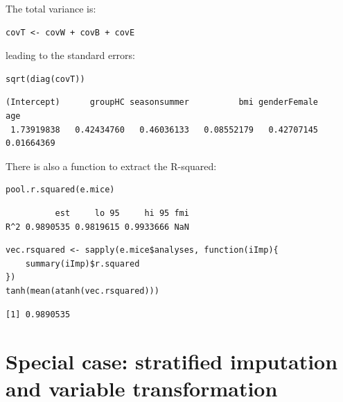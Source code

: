 \documentclass[12pt]{article}
\begin{document}
The total variance is:
\lstset{language=r,label= ,caption= ,captionpos=b,numbers=none}
\begin{lstlisting}
covT <- covW + covB + covE
\end{lstlisting}

leading to the standard errors:
\lstset{language=r,label= ,caption= ,captionpos=b,numbers=none}
\begin{lstlisting}
sqrt(diag(covT))
\end{lstlisting}
\begin{verbatim}
(Intercept)      groupHC seasonsummer          bmi genderFemale          age 
 1.73919838   0.42434760   0.46036133   0.08552179   0.42707145   0.01664369
\end{verbatim}


\bigskip

There is also a function to extract the R-squared:
\lstset{language=r,label= ,caption= ,captionpos=b,numbers=none}
\begin{lstlisting}
pool.r.squared(e.mice)
\end{lstlisting}

\begin{verbatim}
          est     lo 95     hi 95 fmi
R^2 0.9890535 0.9819615 0.9933666 NaN
\end{verbatim}


\lstset{language=r,label= ,caption= ,captionpos=b,numbers=none}
\begin{lstlisting}
vec.rsquared <- sapply(e.mice$analyses, function(iImp){
    summary(iImp)$r.squared
})
tanh(mean(atanh(vec.rsquared)))
\end{lstlisting}

\begin{verbatim}
[1] 0.9890535
\end{verbatim}


\clearpage

\section{Special case: stratified imputation \newline and variable transformation}
\label{sec:org663d02f}
\end{document}
